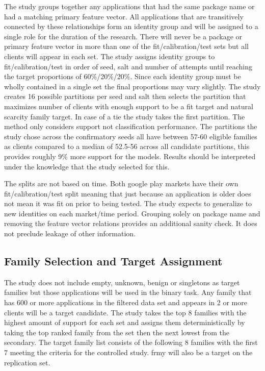 \documentclass[12pt,letterpaper]{article}
\begin{document}
The study groups together any applications that had the same package name or had a matching primary feature vector. All applications that are transitively connected by these relationships form an identity group and will be assigned to a single role for the duration of the research. There will never be a package or primary feature vector in more than one of the fit/calibration/test sets but all clients will appear in each set. The study assigns identity groups to fit/calibration/test in order of seed, salt and number of attempts until reaching the target proportions of 60\%/20\%/20\%. Since each identity group must be wholly contained in a single set the final proportions may vary slightly. The study creates 16 possible partitions per seed and salt then selects the partition that maximizes number of clients with enough support to be a fit target and natural scarcity family target. In case of a tie the study takes the first partition. The method only considers support not classification performance. The partitions the study chose across the confirmatory seeds all have between 57-60 eligible families as clients compared to a median of 52.5-56 across all candidate partitions, this provides roughly 9\% more support for the models. Results should be interpreted under the knowledge that the study selected for this.

The splits are not based on time. Both google play markets have their own fit/calibration/test split meaning that just because an application is older does not mean it was fit on prior to being tested. The study expects to generalize to new identities on each market/time period. Grouping solely on package name and removing the feature vector relations provides an additional sanity check. It does not preclude leakage of other information.

\subsection*{Family Selection and Target Assignment} 

The study does not include empty, unknown, benign or singletons as target families but those applications will be used in the binary task. Any family that has 600 or more applications in the filtered data set and appears in 2 or more clients will be a target candidate. The study takes the top 8 families with the highest amount of support for each set and assigns them deterministically by taking the top ranked family from the set then the next lowest from the secondary. The target family list consists of the following 8 families with the first 7 meeting the criteria for the controlled study. frmy will also be a target on the replication set.
\end{document}
